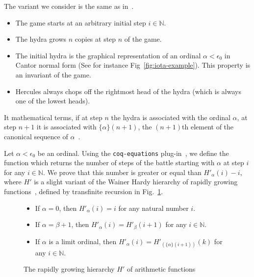 \documentclass{easychair}
\makeatletter
\newcommand{\inputsnippets}[1]
  {{\setlength{\itemsep}{1pt}\setlength{\parsep}{0pt}%
    \alectryon@copymacros\begin{io}
      \forcsvlist{\item\@inputsnippet}{#1}
    \end{io}}}
\let@old Save definition of 
\newcommand{\@inputsnippet}[1]
  {{\renewenvironment{alectryon}{}{}%
    @old{#1}}}
\newcommand{\canonseq}[2]{\mbox{$\{#1\}(#2)$}}
\makeatother
\begin{document}
The variant we consider is the same as 
in~\cite{KP82, bauer2008, BauerHydra}. 


 \begin{itemize}
 \item The game starts at an arbitrary initial step $i\in\mathbb{N}$.
   
   \item The hydra grows $n$ copies at step $n$ of the game.
   \item  The initial hydra is the graphical representation of an ordinal  $\alpha<\epsilon_0$  in Cantor normal form (See for instance Fig~\ref{fig:iota-example}). This property is an invariant of the game.
 \item Hercules always chops off the rightmost head of the hydra (which is always one of the lowest heads).
 \end{itemize}
 It mathematical terms, if at step $n$ the hydra is associated with the ordinal $\alpha$, at step $n+1$ it is associated with
 $\canonseq{\alpha}{n+1}$, the $(n+1)$th element of the canonical sequence of $\alpha$~\cite{KS81}.
 
 



Let $\alpha<\epsilon_0$ be an ordinal.
Using the \texttt{coq-equations} plug-in~\cite{sozeau:hal-01671777}, we define the function which returns the number of steps of the battle starting with $\alpha$ at step $i$ for  any $i\in\mathbb{N}$.
We prove that this number is greater or equal than
$H'_\alpha(i)-i$, where $H'$ is a slight variant of the Wainer Hardy hierarchy of rapidly growing functions~\cite{BW85, KS81, Promel2013, Wainer1970}, defined by transfinite recursion in Fig.~\ref{fig:Hprime}.


\begin{figure}[h]
  \centering
  \begin{itemize}
\item If $\alpha=0$, then $H'_\alpha (i)= i$ for any natural number $i$.
\item If $\alpha=\beta+1$, then 
$H'_\alpha(i)=H'_\beta(i+1)$ for any $i \in \mathbb{N}$.
\item If $\alpha$ is a limit ordinal, then 
$H'_\alpha(i) = H'_{(\canonseq{\alpha}{i+1})}(k)$ for any $i\in \mathbb{N}$.
\end{itemize}
\vspace{4pt}
\inputsnippets{HprimeDef}
\caption{The rapidly growing hierarchy $H'$ of arithmetic functions}
\label{fig:Hprime}
\end{figure}
\end{document}
